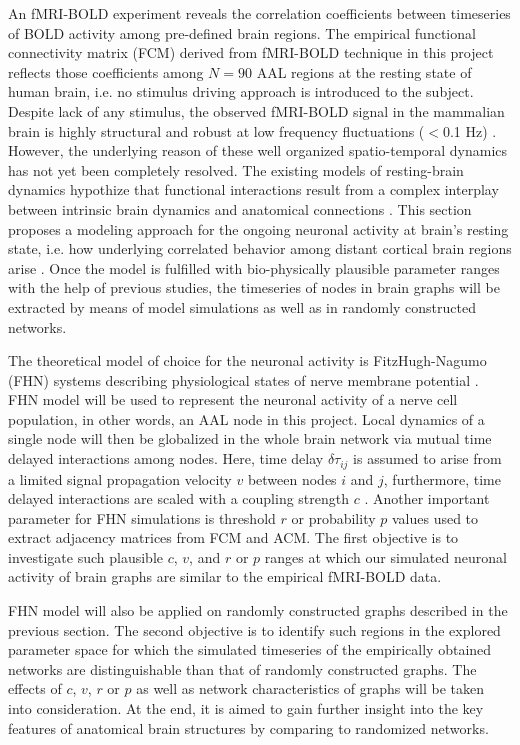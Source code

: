 An fMRI-BOLD experiment reveals the correlation coefficients between timeseries of BOLD activity among pre-defined brain regions. The empirical functional connectivity matrix (FCM) derived from fMRI-BOLD technique in this project reflects those coefficients among $N=90$ AAL regions at the resting state of human brain, i.e. no stimulus driving approach is introduced to the subject. Despite lack of any stimulus, the observed fMRI-BOLD signal in the mammalian brain is highly structural and robust at low frequency fluctuations ($<$0.1 Hz) \citep{BIS95, DAM06, VIN07a}. However, the underlying reason of these well organized spatio-temporal dynamics has not yet been completely resolved. The existing models of resting-brain dynamics hypothize that functional interactions result from a complex interplay between intrinsic brain dynamics and anatomical connections \citep{RUB09}. This section proposes a modeling approach for the ongoing neuronal activity at brain's resting state, i.e. how  underlying correlated behavior among distant cortical brain regions arise \citep{VUK13}. Once the model is fulfilled with bio-physically plausible parameter ranges with the help of previous studies, the timeseries of nodes in brain graphs will be extracted by means of model simulations as well as in randomly constructed networks. 

The theoretical model of choice for the neuronal activity is FitzHugh-Nagumo (FHN) systems describing physiological states of nerve membrane potential \citep{FIT61, NAG62}. FHN model will be used to represent the neuronal activity of a nerve cell population, in other words, an AAL node in this project. Local dynamics of a single node will then be globalized in the whole brain network via mutual time delayed interactions among nodes. Here, time delay $\delta \tau_{ij}$ is assumed to arise from a limited signal propagation velocity $v$ between nodes $i$ and $j$, furthermore, time delayed interactions are scaled with a coupling strength $c$ \citep{GHO08, GHO08a, DEC09}. Another important parameter for FHN simulations is threshold $r$ or probability $p$ values used to extract adjacency matrices from FCM and ACM. The first objective is to investigate such plausible $c$, $v$, and $r$ or $p$ ranges at which our simulated neuronal activity of brain graphs are similar to the empirical fMRI-BOLD data. 

FHN model will also be applied on randomly constructed graphs described in the previous section. The second objective is to identify such regions in the explored parameter space for which the simulated timeseries of the empirically obtained networks are distinguishable than that of randomly constructed graphs. The effects of $c$, $v$, $r$ or $p$ as well as network characteristics of graphs will be taken into consideration. At the end, it is aimed to gain further insight into the key features of anatomical brain structures by comparing to randomized networks.  
 
